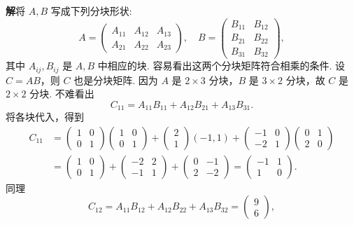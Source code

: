 \documentclass[UTF8,12pt,a4paper,fontset=fandol]{ctexart}
\begin{document}
\noindent\textbf{解}\quad 将 $A,B$ 写成下列分块形状:
\[
A=\left(\begin{array}{ccc}
A_{11} & A_{12} & A_{13}\\
A_{21} & A_{22} & A_{23}
\end{array}\right),\quad
B=\left(\begin{array}{cc}
B_{11} & B_{12}\\
B_{21} & B_{22}\\
B_{31} & B_{32}
\end{array}\right),
\]
其中 $A_{ij},B_{ij}$ 是 $A,B$ 中相应的块. 容易看出这两个分块矩阵符合相乘的条件. 设 $C=AB$，则 $C$ 也是分块矩阵. 因为 $A$ 是 $2\times 3$ 分块，$B$ 是 $3\times 2$ 分块，故 $C$ 是 $2\times 2$ 分块. 不难看出
\[
C_{11}=A_{11}B_{11}+A_{12}B_{21}+A_{13}B_{31}.
\]
将各块代入，得到
\[
\begin{aligned}
C_{11}
&=\left(\begin{array}{cc}
1 & 0\\
0 & 1
\end{array}\right)
\left(\begin{array}{cc}
1 & 0\\
0 & 1
\end{array}\right)
+\left(\begin{array}{c}
2\\
1
\end{array}\right)(-1,1)
+\left(\begin{array}{rr}
-1 & 0\\
-2 & 1
\end{array}\right)
\left(\begin{array}{cc}
0 & 1\\
2 & 0
\end{array}\right)\\
&=\left(\begin{array}{cc}
1 & 0\\
0 & 1
\end{array}\right)
+\left(\begin{array}{rr}
-2 & 2\\
-1 & 1
\end{array}\right)
+\left(\begin{array}{rr}
0 & -1\\
2 & -2
\end{array}\right)
=\left(\begin{array}{rr}
-1 & 1\\
1 & 0
\end{array}\right).
\end{aligned}
\]
同理
\[
C_{12}=A_{11}B_{12}+A_{12}B_{22}+A_{13}B_{32}=\left(\begin{array}{c}
9\\
6
\end{array}\right),
\]
\end{document}
